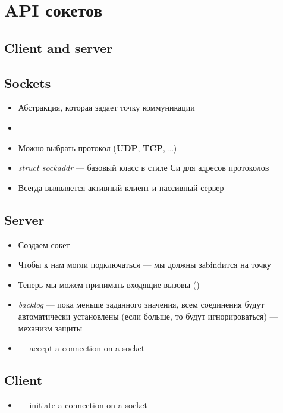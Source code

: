 \documentclass[../../lectures.tex]{subfiles}
\begin{document}
\chapter{API сокетов}

\section{Client and server}

\section{Sockets}
\begin{itemize}
    \item Абстракция, которая задает точку коммуникации
    \item {}
    \item Можно выбрать протокол (\textbf{UDP}, \textbf{TCP}, \ldots)
    \item \emph{struct sockaddr} --- базовый класс в стиле Си для адресов протоколов
    \item Всегда выявляется активный клиент и пассивный сервер
\end{itemize}

\section{Server}
\begin{itemize}
    \item Создаем сокет
    \item Чтобы к нам могли подключаться --- мы должны заbindится на точку\\
    \item Теперь мы можем принимать входящие вызовы ()
    \item \emph{backlog} --- пока меньше заданного значения, всем соединения будут 
          автоматически установлены (если больше, то будут игнорироваться) 
          --- механизм защиты
    \item {} --- accept a connection on a socket
\end{itemize}

\section{Client}
\begin{itemize}
    \item {} --- initiate a connection on a socket
\end{itemize}
\end{document}
